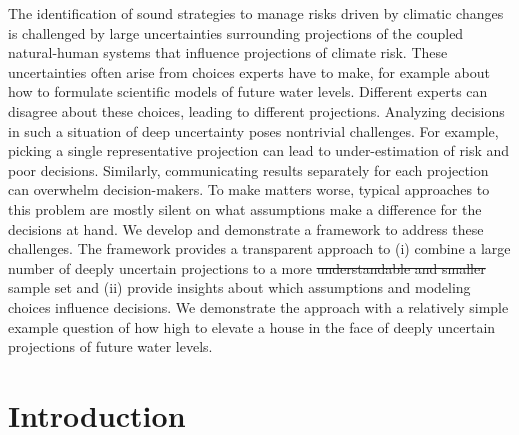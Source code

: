 \documentclass{agujournal2019}
\providecommand{\DIFadd}[1]{{\protect\color{blue}\uwave{#1}}} %
\providecommand{\DIFdel}[1]{{\protect\color{red}\sout{#1}}}                      %
\providecommand{\DIFaddbegin}{} %
\providecommand{\DIFaddend}{} %
\providecommand{\DIFdelbegin}{} %
\providecommand{\DIFdelend}{} %
\newcommand{\DIFscaledelfig}{0.5}
\newlength{\DIFdelgraphicswidth} %
\newlength{\DIFdelgraphicsheight} %
\newcommand{\DIFaddincludegraphics}[2][]{{\color{blue}\fbox{\DIFOincludegraphics[#1]{#2}}}} %
\newcommand{\DIFdelincludegraphics}[2][]{%
\sbox{\DIFdelgraphicsbox}{\DIFOincludegraphics[#1]{#2}}%
\settoboxwidth{\DIFdelgraphicswidth}{\DIFdelgraphicsbox} %
\settoboxtotalheight{\DIFdelgraphicsheight}{\DIFdelgraphicsbox} %
\scalebox{\DIFscaledelfig}{%
\parbox[b]{\DIFdelgraphicswidth}{\usebox{\DIFdelgraphicsbox}\\[-\baselineskip] \rule{\DIFdelgraphicswidth}{0em}}\llap{\resizebox{\DIFdelgraphicswidth}{\DIFdelgraphicsheight}{%
\setlength{\unitlength}{\DIFdelgraphicswidth}%
\begin{picture}(1,1)%
\thicklines\linethickness{2pt} %
{\color[rgb]{1,0,0}\put(0,0){\framebox(1,1){}}}%
{\color[rgb]{1,0,0}\put(0,0){\line( 1,1){1}}}%
{\color[rgb]{1,0,0}\put(0,1){\line(1,-1){1}}}%
\end{picture}%
}\hspace*{3pt}}} %
} %
\DeclareRobustCommand{\DIFaddbegin}{\DIFOaddbegin \let\includegraphics\DIFaddincludegraphics} %
\DeclareRobustCommand{\DIFaddend}{\DIFOaddend \let\includegraphics\DIFOincludegraphics} %
\DeclareRobustCommand{\DIFdelbegin}{\DIFOdelbegin \let\includegraphics\DIFdelincludegraphics} %
\DeclareRobustCommand{\DIFdelend}{\DIFOaddend \let\includegraphics\DIFOincludegraphics} %
\begin{document}
The identification of sound strategies to manage risks driven by climatic changes is challenged by large uncertainties surrounding projections of the coupled natural-human systems that influence projections of climate risk.
These uncertainties often arise from choices experts have to make, for example about how to formulate scientific models of future water levels.
Different experts can disagree about these choices, leading to different projections.
Analyzing decisions in such a situation of deep uncertainty poses nontrivial challenges.
For example, picking a single representative projection can lead to under-estimation of risk and poor decisions.
Similarly, communicating results separately for each projection can overwhelm decision-makers.
To make matters worse, typical approaches to this problem are mostly silent on what assumptions make a difference for the decisions at hand.
We develop and demonstrate a framework to address these challenges.
The framework provides a transparent approach to (i) combine a large number of deeply uncertain projections to a more \DIFdelbegin \DIFdel{understandable and smaller }\DIFdelend \DIFaddbegin \DIFadd{interpretable }\DIFaddend sample set and (ii) provide insights about which assumptions and modeling choices influence decisions.
We demonstrate the approach with a relatively simple example question of how high to elevate a house in the face of deeply uncertain projections of future water levels.

\DIFaddbegin \clearpage
\DIFaddend \section{Introduction}\label{sec:introduction}
\end{document}
